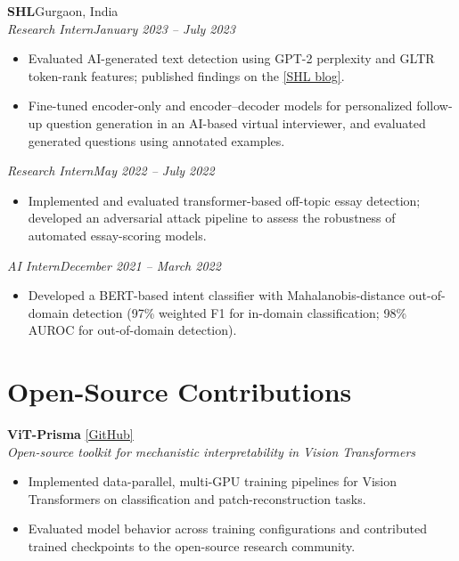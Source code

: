 \documentclass[letterpaper,10pt]{article}
\newcommand{\subentry}[2]{\textit{#1}\hfill \textit{#2}\\[-2pt]}
\begin{document}
\textbf{SHL}\hfill Gurgaon, India\\[-1pt]
\subentry{Research Intern}{January 2023 -- July 2023}
\begin{itemize}
  \item Evaluated AI-generated text detection using GPT-2 perplexity and GLTR token-rank features; published findings on the \href{https://www.shl.com/resources/by-type/blog/2023/the-battle-of-the-pens-insights-into-detecting-ai-generated-text/}{[SHL blog]}.
  \item Fine-tuned encoder-only and encoder--decoder models for personalized follow-up question generation in an AI-based virtual interviewer, and evaluated generated questions using annotated examples.
\end{itemize}
\subentry{Research Intern}{May 2022 -- July 2022}
\begin{itemize}
  \item Implemented and evaluated transformer-based off-topic essay detection; developed an adversarial attack pipeline to assess the robustness of automated essay-scoring models.
\end{itemize}
\subentry{AI Intern}{December 2021 -- March 2022}
\begin{itemize}
  \item Developed a BERT-based intent classifier with Mahalanobis-distance out-of-domain detection (97\% weighted F1 for in-domain classification; 98\% AUROC for out-of-domain detection).
\end{itemize}

\section{Open-Source Contributions}
\textbf{ViT-Prisma} \hfill \href{https://github.com/soniajoseph/ViT-Prisma}{[GitHub]}\\[-1pt]
\textit{Open-source toolkit for mechanistic interpretability in Vision Transformers}
\begin{itemize}
  \item Implemented data-parallel, multi-GPU training pipelines for Vision Transformers on classification and patch-reconstruction tasks.
  \item Evaluated model behavior across training configurations and contributed trained checkpoints to the open-source research community.
\end{itemize}

\end{document}
